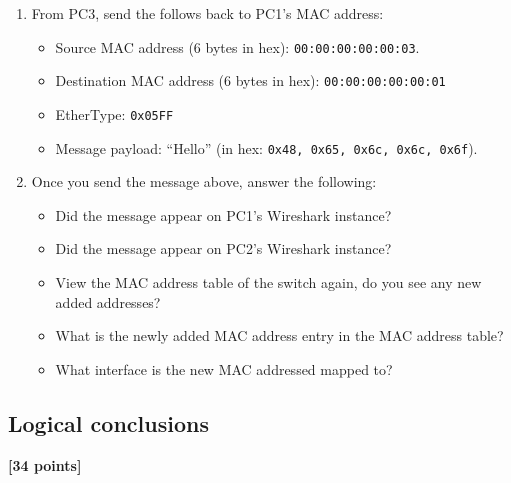 \documentclass[pdftex,12pt,a4paper]{article}
\begin{document}
            \begin{enumerate}
                \item From PC3, send the follows back to PC1's MAC address:
                    \begin{itemize}
                        \item Source MAC address (6 bytes in hex):
                        \texttt{00:00:00:00:00:03}.
                        \item Destination MAC address (6 bytes in hex):
                        \texttt{00:00:00:00:00:01}
                        \item EtherType: \texttt{0x05FF}
                        \item Message payload: ``Hello'' (in hex: \texttt{0x48,
                        0x65, 0x6c, 0x6c, 0x6f}).
                    \end{itemize}

                \item Once you send the message above, answer the following:
                    \begin{itemize}
                        \item Did the message appear on PC1's Wireshark
                        instance?
                        \item Did the message appear on PC2's Wireshark
                        instance?
                        \item View the MAC address table of the switch again,
                        do you see any new added addresses? 
                        \item What is the newly added MAC address entry in the
                        MAC address table?
                        \item What interface is the new MAC addressed mapped
                        to?
                    \end{itemize}
            \end{enumerate}

        \subsection{Logical conclusions}
            \begin{flushright}
                \textbf{[34 points]}
            \end{flushright}
\end{document}

